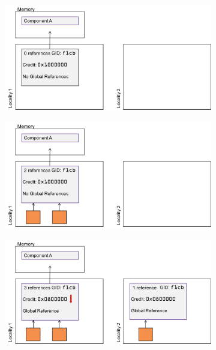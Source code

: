 \begin{figure}
    \centering
    \begin{subfigure}{0.4\textwidth}
        \includegraphics[width=\textwidth]{illustrations/reference_counting_1}
        \caption{}
    \end{subfigure}
    \vspace{1em}
    \begin{subfigure}{0.4\textwidth}
        \includegraphics[width=\textwidth]{illustrations/reference_counting_2}
        \caption{}
    \end{subfigure}
    \vspace{1em}
    \begin{subfigure}{0.4\textwidth}
        \includegraphics[width=\textwidth]{illustrations/reference_counting_3}

\end{subfigure}
\end{figure}
